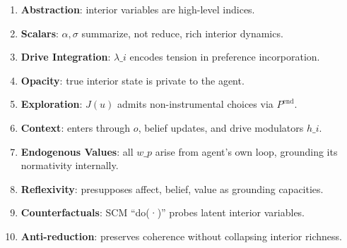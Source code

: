 \documentclass[
]{article}
\providecommand{\tightlist}{%
  \setlength{\itemsep}{0pt}\setlength{\parskip}{0pt}}
\begin{document}
\begin{enumerate}
\def\labelenumi{\arabic{enumi}.}
\tightlist
\item
  \textbf{Abstraction}: interior variables are high-level indices.
\item
  \textbf{Scalars}: \(\alpha,\sigma\) summarize, not reduce, rich
  interior dynamics.
\item
  \textbf{Drive Integration}: \(\lambda\_i\) encodes tension in
  preference incorporation.
\item
  \textbf{Opacity}: true interior state is private to the agent.
\item
  \textbf{Exploration}: \(J(u)\) admits non-instrumental choices via
  \(P^{\mathrm{end}}\).
\item
  \textbf{Context}: enters through \(o\), belief updates, and drive
  modulators \(h\_i\).
\item
  \textbf{Endogenous Values}: all \(w\_p\) arise from agent's own loop,
  grounding its normativity internally.
\item
  \textbf{Reflexivity}: presupposes affect, belief, value as grounding
  capacities.
\item
  \textbf{Counterfactuals}: SCM ``do(·)'' probes latent interior
  variables.
\item
  \textbf{Anti-reduction}: preserves coherence without collapsing
  interior richness.
\end{enumerate}
\end{document}
